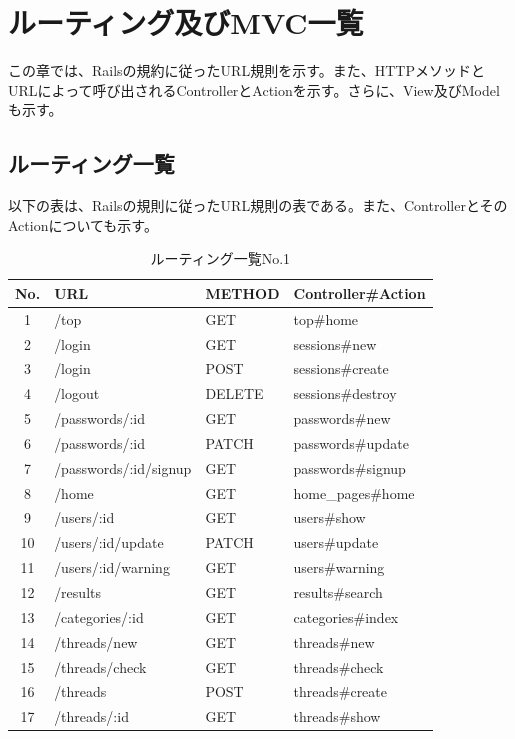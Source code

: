 \documentclass[a4j]{jarticle}
\begin{document}
\section{ルーティング及びMVC一覧}
この章では、Railsの規約に従ったURL規則を示す。また、HTTPメソッドとURLによって呼び出されるControllerとActionを示す。さらに、View及びModelも示す。
\newpage
\subsection{ルーティング一覧}
以下の表は、Railsの規則に従ったURL規則の表である。また、ControllerとそのActionについても示す。



\begin{table}[htb]
  \caption{ルーティング一覧No.1}
  \centering
  \begin{tabular}{|c|l|l||l|} \hline
   No. & URL & METHOD & Controller\#Action \\ \hline \hline

   1 & /top & GET & top\#home \\ \hline

	 2 & /login & GET & sessions\#new \\
   3 & /login & POST & sessions\#create \\
	 4 & /logout & DELETE & sessions\#destroy \\ \hline

	 5 &	/passwords/:id & GET & passwords\#new \\
	 6 & /passwords/:id	& PATCH	& passwords\#update \\
   7 & /passwords/:id/signup & GET & passwords\#signup \\ \hline

	 8 &	/home	& GET & home\_pages\#home \\ \hline

	 9 &	/users/:id & GET & users\#show \\
	 10 &	/users/:id/update & PATCH & users\#update \\
   11 & /users/:id/warning & GET & users\#warning \\ \hline

	12 &	/results & GET & results\#search \\ \hline

	13 &	/categories/:id & GET & categories\#index \\ \hline

	14 &	/threads/new  & GET & threads\#new \\
	15 & /threads/check & GET & threads\#check \\
	16 & /threads & POST & threads\#create \\
  17 & /threads/:id & GET & threads\#show \\ \hline


\end{tabular}
\end{table}
\end{document}
